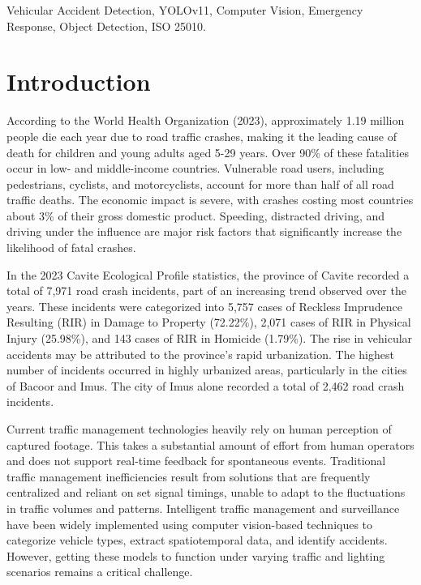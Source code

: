 \documentclass[conference]{IEEEtran}
\begin{document}
\begin{IEEEkeywords}
Vehicular Accident Detection, YOLOv11, Computer Vision, Emergency Response, Object Detection, ISO 25010.
\end{IEEEkeywords}

\section{Introduction}

According to the World Health Organization (2023), approximately 1.19 million people die each year due to road traffic crashes, making it the leading cause of death for children and young adults aged 5-29 years. Over 90\% of these fatalities occur in low- and middle-income countries. Vulnerable road users, including pedestrians, cyclists, and motorcyclists, account for more than half of all road traffic deaths. The economic impact is severe, with crashes costing most countries about 3\% of their gross domestic product. Speeding, distracted driving, and driving under the influence are major risk factors that significantly increase the likelihood of fatal crashes.

In the 2023 Cavite Ecological Profile statistics, the province of Cavite recorded a total of 7,971 road crash incidents, part of an increasing trend observed over the years. These incidents were categorized into 5,757 cases of Reckless Imprudence Resulting (RIR) in Damage to Property (72.22\%), 2,071 cases of RIR in Physical Injury (25.98\%), and 143 cases of RIR in Homicide (1.79\%). The rise in vehicular accidents may be attributed to the province's rapid urbanization. The highest number of incidents occurred in highly urbanized areas, particularly in the cities of Bacoor and Imus. The city of Imus alone recorded a total of 2,462 road crash incidents.

Current traffic management technologies heavily rely on human perception of captured footage. This takes a substantial amount of effort from human operators and does not support real-time feedback for spontaneous events. Traditional traffic management inefficiencies result from solutions that are frequently centralized and reliant on set signal timings, unable to adapt to the fluctuations in traffic volumes and patterns. Intelligent traffic management and surveillance have been widely implemented using computer vision-based techniques to categorize vehicle types, extract spatiotemporal data, and identify accidents. However, getting these models to function under varying traffic and lighting scenarios remains a critical challenge. 
\end{document}
